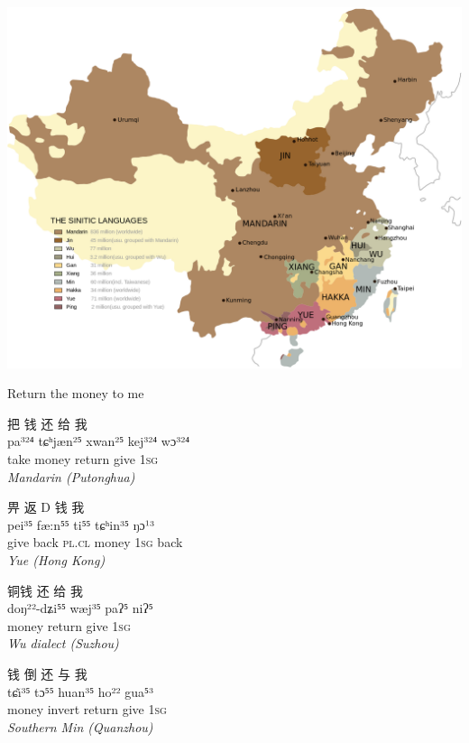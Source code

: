 \documentclass{beamer}
\begin{document}
\begin{frame}
  \begin{center} 
    \includegraphics[height=0.9\textheight]{pics/image15.png}
  \end{center}
\end{frame}



\begin{frame}

Return the money to me
\begin{exe}

\ex
\glll 把 钱 还 给 我 \\
     pa³²⁴ tɕʰjæn²⁵ xwan²⁵ kej³²⁴ wɔ³²⁴ \\
     take money return give 1\textsc{sg} \\ 
  \hfill     \textit{Mandarin (Putonghua)}
     
\ex \glll  畀 返 D 钱 我 \\
 pei³⁵ fæ:n⁵⁵ ti⁵⁵ tɕʰin³⁵ ŋɔ¹³ \\
 give back \textsc{pl.cl} money 1\textsc{sg} back \\
\hfill  \textit{Yue (Hong Kong)}

\ex \glll 铜钱 还 给 我 \\
      doŋ²²-dʑi⁵⁵ wæj³⁵ paʔ⁵ niʔ⁵ \\
     money return give 1\textsc{sg} \\
 \hfill  \textit{Wu dialect (Suzhou)}


\ex \glll 钱 倒 还 与 我 \\
  tɕı̃³⁵ tɔ⁵⁵ huan³⁵ ho²² gua⁵³ \\
 money invert return give 1\textsc{sg} \\
 \hfill \textit{Southern Min (Quanzhou)}
  
\end{exe}
 
\end{frame}
\end{document}
